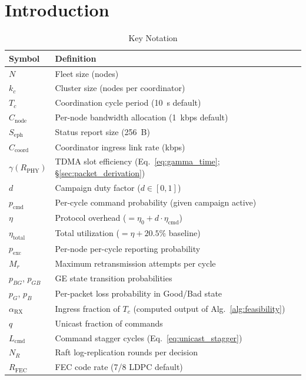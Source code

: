 \documentclass[journal]{IEEEtran}
\begin{document}
\section{Introduction}

\begin{table}[t]
    \centering
    \caption{Key Notation}
    \label{tab:notation}
    \begin{tabular}{@{}ll@{}}
        \toprule
        \textbf{Symbol} & \textbf{Definition} \\
        \midrule
        $N$ & Fleet size (nodes) \\
        $k_c$ & Cluster size (nodes per coordinator) \\
        $T_c$ & Coordination cycle period (10~s default) \\
        $C_{\text{node}}$ & Per-node bandwidth allocation (1~kbps default) \\
        $S_{\text{eph}}$ & Status report size (256~B) \\
        $C_{\text{coord}}$ & Coordinator ingress link rate (kbps) \\
        $\gamma(R_{\text{PHY}})$ & TDMA slot efficiency (Eq.~\ref{eq:gamma_time}; \S\ref{sec:packet_derivation}) \\
        $d$ & Campaign duty factor ($d \in [0,1]$) \\
        $p_{\text{cmd}}$ & Per-cycle command probability (given campaign active) \\
        $\eta$ & Protocol overhead ($= \eta_0 + d \cdot \eta_{\text{cmd}}$) \\
        $\eta_{\text{total}}$ & Total utilization ($= \eta + 20.5\%$ baseline) \\
        $p_{\text{exc}}$ & Per-node per-cycle reporting probability \\
        $M_r$ & Maximum retransmission attempts per cycle \\
        $p_{BG}$, $p_{GB}$ & GE state transition probabilities \\
        $p_G$, $p_B$ & Per-packet loss probability in Good/Bad state \\
        $\alpha_{\text{RX}}$ & Ingress fraction of $T_c$ (computed output of Alg.~\ref{alg:feasibility}) \\
        $q$ & Unicast fraction of commands \\
        $L_{\text{cmd}}$ & Command stagger cycles (Eq.~\ref{eq:unicast_stagger}) \\
        $N_R$ & Raft log-replication rounds per decision \\
        $R_{\text{FEC}}$ & FEC code rate (7/8 LDPC default) \\
        \bottomrule
    \end{tabular}
\end{table}
\end{document}
